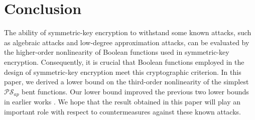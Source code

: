 \documentclass{article}
\newcommand{\0}{\textbf{0}}
\newcommand{\1}{\textbf{1}}
\theoremstyle{plain}
\begin{document}
\section{Conclusion}
    The ability of symmetric-key encryption to withstand some known attacks, such as algebraic attacks and low-degree approximation attacks, can be evaluated by the higher-order nonlinearity of Boolean functions used in symmetric-key encryption.
    Consequently, it is crucial that Boolean functions employed in the design of symmetric-key encryption meet this cryptographic criterion.
    In this paper, we derived a lower bound on the third-order nonlinearity of the simplest $\mathcal{PS}_{ap}$ bent functions.
    Our lower bound improved the previous two lower bounds in earlier works \cite{TangCT2013NL_2bent,Carlet2011NL_Profile_Dillon}.
    We hope that the result obtained in this paper will play an important role with respect to countermeasures against these known attacks.



\end{document}

